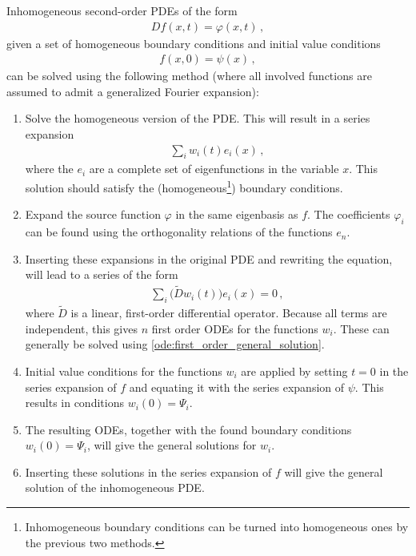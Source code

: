     \begin{method}
        Inhomogeneous second-order PDEs of the form
        \begin{gather}
            Df(x,t) = \varphi(x,t)\,,
        \end{gather}
        given a set of homogeneous boundary conditions and initial value conditions
        \begin{gather}
            f(x,0)=\psi(x)\,,
        \end{gather}
        can be solved using the following method (where all involved functions are assumed to admit a generalized Fourier expansion):
        \begin{enumerate}
            \item Solve the homogeneous version of the PDE. This will result in a series expansion
            \begin{gather}
                \sum_iw_i(t)e_i(x)\,,
            \end{gather}
            where the $e_i$ are a complete set of eigenfunctions in the variable $x$. This solution should satisfy the (homogeneous\footnote{Inhomogeneous boundary conditions can be turned into homogeneous ones by the previous two methods.}) boundary conditions.
            \item Expand the source function $\varphi$ in the same eigenbasis as $f$. The coefficients $\varphi_i$ can be found using the orthogonality relations of the functions $e_n$.
            \item Inserting these expansions in the original PDE and rewriting the equation, will lead to a series of the form
            \begin{gather}
                \sum_i\bigl(\widetilde{D}w_i(t)\bigr)e_i(x) = 0\,,
            \end{gather}
            where $\widetilde{D}$ is a linear, first-order differential operator. Because all terms are independent, this gives $n$ first order ODEs for the functions $w_i$. These can generally be solved using \cref{ode:first_order_general_solution}.
            \item Initial value conditions for the functions $w_i$ are applied by setting $t=0$ in the series expansion of $f$ and equating it with the series expansion of $\psi$. This results in conditions $w_i(0)=\Psi_i$.
            \item The resulting ODEs, together with the found boundary conditions $w_i(0)=\Psi_i$, will give the general solutions for $w_i$.
            \item Inserting these solutions in the series expansion of $f$ will give the general solution of the inhomogeneous PDE.
        \end{enumerate}
    \end{method}

